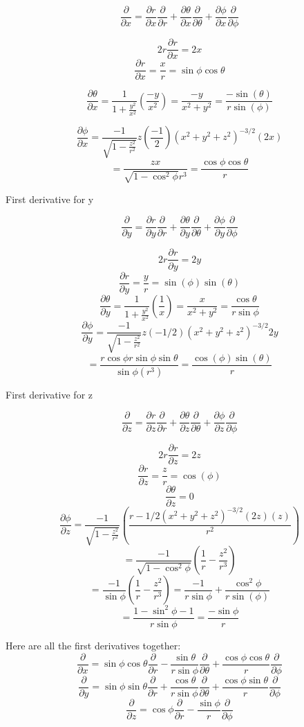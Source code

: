 \documentclass{article}
\begin{document}
$$\frac{\partial}{\partial x}=\frac{\partial r}{\partial x}\frac{\partial}{\partial r} + \frac{\partial \theta}{\partial x}\frac{\partial}{\partial \theta} + \frac{\partial \phi}{\partial x}\frac{\partial}{\partial \phi}$$

$$2r\frac{\partial r}{\partial x}=2x$$
$$\frac{\partial r}{\partial x}=\frac{x}{r}=\sin\phi\cos\theta$$

$$\frac{\partial \theta}{\partial x}=\frac{1}{1+\frac{y^{2}}{x^{2}}}(\frac{-y}{x^{2}})=\frac{-y}{x^{2}+y^{2}}=\frac{-\sin(\theta)}{r\sin(\phi)}$$

$$\frac{\partial \phi}{\partial x}=\frac{-1}{\sqrt{1-\frac{z^{2}}{r^{2}}}}z(\frac{-1}{2})(x^{2}+y^{2}+z^{2})^{-3/2}(2x)$$
$$=\frac{zx}{\sqrt{1-\cos^{2}\phi}r^{3}}=\frac{\cos\phi\cos\theta}{r}$$

First derivative for y

$$\frac{\partial}{\partial y}=\frac{\partial r}{\partial y}\frac{\partial}{\partial r}+\frac{\partial \theta}{\partial y}\frac{\partial}{\partial \theta}+\frac{\partial \phi}{\partial y}\frac{\partial}{\partial \phi}$$

$$2r\frac{\partial r}{\partial y}=2y$$
$$\frac{\partial r}{\partial y}=\frac{y}{r}=\sin(\phi)\sin(\theta)$$
$$\frac{\partial \theta}{\partial y}=\frac{1}{1+\frac{y^{2}}{x^{2}}}(\frac{1}{x})=\frac{x}{x^{2}+y^{2}}=\frac{\cos\theta}{r\sin\phi}$$
$$\frac{\partial \phi}{\partial y}=\frac{-1}{\sqrt{1-\frac{z^{2}}{r^{2}}}}z(-1/2)(x^{2}+y^{2}+z^{2})^{-3/2}2y$$
$$=\frac{r\cos{\phi}r\sin{\phi}\sin{\theta}}{\sin{\phi}(r^{3})}=\frac{\cos(\phi)\sin(\theta)}{r}$$

First derivative for z

$$\frac{\partial}{\partial z}=\frac{\partial r}{\partial z}\frac{\partial}{\partial r}+\frac{\partial \theta}{\partial z}\frac{\partial}{\partial \theta}+\frac{\partial \phi}{\partial z}\frac{\partial}{\partial \phi}$$

$$2r\frac{\partial r}{\partial z}=2z$$
$$\frac{\partial r}{\partial z}=\frac{z}{r}=\cos(\phi)$$
$$\frac{\partial \theta}{\partial z}=0$$
$$\frac{\partial \phi}{\partial z}=\frac{-1}{\sqrt{1-\frac{z^2}{r^2}}}(\frac{r - 1/2(x^{2}+y^{2}+z^{2})^{-3/2}(2z)(z)}{r^{2}})$$
$$=\frac{-1}{\sqrt{1-\cos^{2}\phi}}(\frac{1}{r}-\frac{z^{2}}{r{^3}})$$
$$=\frac{-1}{\sin \phi}(\frac{1}{r}-\frac{z^{2}}{r^{3}})=\frac{-1}{r\sin\phi}+\frac{\cos^{2}\phi}{r\sin(\phi)}$$
$$=\frac{1-\sin^{2}\phi-1}{r\sin\phi}=\frac{-\sin\phi}{r}$$

Here are all the first derivatives together:
$$\frac{\partial}{\partial x}=\sin\phi\cos\theta\frac{\partial }{\partial r}-\frac{\sin\theta}{r\sin\phi}\frac{\partial}{\partial \theta} + \frac{\cos\phi\cos\theta}{r}\frac{\partial}{\partial \phi}$$
$$\frac{\partial}{\partial y}=\sin\phi\sin\theta\frac{\partial}{\partial r}+\frac{\cos\theta}{r\sin\phi}\frac{\partial}{\partial \theta}+\frac{\cos\phi\sin\theta}{r}\frac{\partial}{\partial \phi}$$
$$\frac{\partial}{\partial z}=\cos\phi\frac{\partial}{\partial r} - \frac{\sin\phi}{r}\frac{\partial}{\partial\phi}$$
\end{document}
